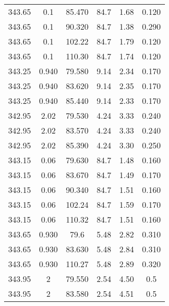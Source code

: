 \begin{longtable}{||c|c|c|c|c|c||}
343.65	&0.1	&85.470	&84.7	&1.68	&0.120\\
343.65	&0.1	&90.320	&84.7	&1.38	&0.290\\
343.65	&0.1	&102.22	&84.7	&1.79	&0.120\\
343.65	&0.1	&110.30	&84.7	&1.74	&0.120\\
343.25	&0.940	&79.580	&9.14	&2.34	&0.170\\
343.25	&0.940	&83.620	&9.14	&2.35	&0.170\\
343.25	&0.940	&85.440	&9.14	&2.33	&0.170\\
342.95	&2.02	&79.530	&4.24	&3.33	&0.240\\
342.95	&2.02	&83.570	&4.24	&3.33	&0.240\\
342.95	&2.02	&85.390	&4.24	&3.30	&0.250\\
343.15	&0.06	&79.630	&84.7	&1.48	&0.160\\
343.15	&0.06	&83.670	&84.7	&1.49	&0.170\\
343.15	&0.06	&90.340	&84.7	&1.51	&0.160\\
343.15	&0.06	&102.24	&84.7	&1.59	&0.170\\
343.15	&0.06	&110.32	&84.7	&1.51	&0.160\\
343.65	&0.930	&79.6	&5.48	&2.82	&0.310\\
343.65	&0.930	&83.630	&5.48	&2.84	&0.310\\
343.65	&0.930	&110.27	&5.48	&2.89	&0.320\\
343.95	&2		&79.550	&2.54	&4.50	&0.5\\
343.95	&2		&83.580	&2.54	&4.51	&0.5\\
\hline
\end{longtable}
